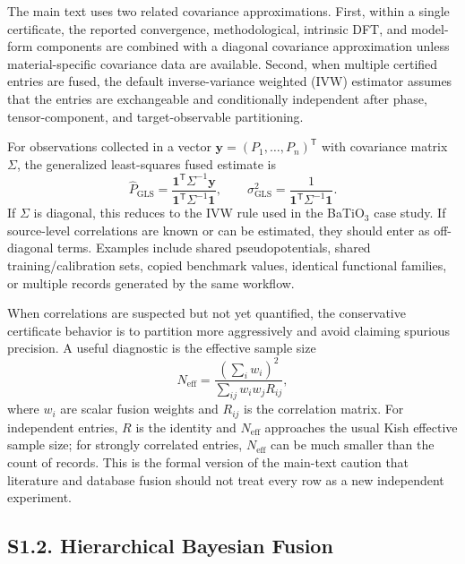 \documentclass[onecolumn,superscriptaddress,amsmath,amssymb,longbibliography]{revtex4-2}
\begin{document}
The main text uses two related covariance approximations. First, within a
single certificate, the reported convergence, methodological, intrinsic DFT,
and model-form components are combined with a diagonal covariance
approximation unless material-specific covariance data are available. Second,
when multiple certified entries are fused, the default inverse-variance
weighted (IVW) estimator assumes that the entries are exchangeable and
conditionally independent after phase, tensor-component, and target-observable
partitioning.

For observations collected in a vector
$\mathbf{y}=(P_1,\ldots,P_n)^{\mathsf T}$ with covariance matrix $\Sigma$, the
generalized least-squares fused estimate is
\begin{equation}
    \hat{P}_{\mathrm{GLS}} =
    \frac{\mathbf{1}^{\mathsf T}\Sigma^{-1}\mathbf{y}}
         {\mathbf{1}^{\mathsf T}\Sigma^{-1}\mathbf{1}},
    \qquad
    \sigma_{\mathrm{GLS}}^2 =
    \frac{1}{\mathbf{1}^{\mathsf T}\Sigma^{-1}\mathbf{1}} .
\end{equation}
If $\Sigma$ is diagonal, this reduces to the IVW rule used in the BaTiO$_3$
case study. If source-level correlations are known or can be estimated, they
should enter as off-diagonal terms. Examples include shared pseudopotentials,
shared training/calibration sets, copied benchmark values, identical
functional families, or multiple records generated by the same workflow.

When correlations are suspected but not yet quantified, the conservative
certificate behavior is to partition more aggressively and avoid claiming
spurious precision. A useful diagnostic is the effective sample size
\begin{equation}
    N_{\mathrm{eff}} =
    \frac{(\sum_i w_i)^2}{\sum_{ij} w_i w_j R_{ij}},
\end{equation}
where $w_i$ are scalar fusion weights and $R_{ij}$ is the correlation matrix.
For independent entries, $R$ is the identity and $N_{\mathrm{eff}}$ approaches
the usual Kish effective sample size; for strongly correlated entries,
$N_{\mathrm{eff}}$ can be much smaller than the count of records. This is the
formal version of the main-text caution that literature and database fusion
should not treat every row as a new independent experiment.

\subsection{S1.2. Hierarchical Bayesian Fusion}
\label{sec:si_bayesian}
\end{document}
